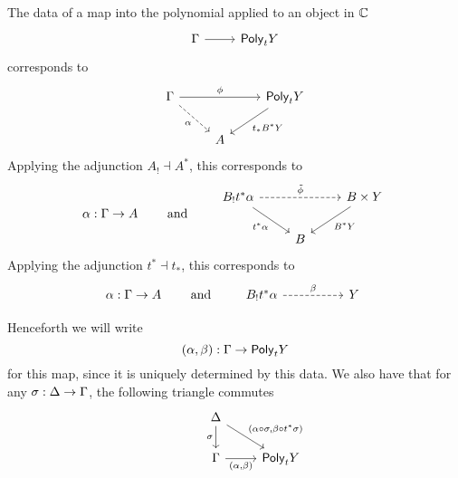 \begin{prop}
  \label{polynomial_endofunctor_property}
  The data of a map into the polynomial applied to an object in $\mathbb{C}$
\[\begin{tikzcd}
	\Ga & {\Poly{t} Y}
	\arrow[from=1-1, to=1-2]
\end{tikzcd}\]
  corresponds to
\[\begin{tikzcd}
	\Ga && {\Poly{t} Y} \\
	& A
	\arrow["\phi", from=1-1, to=1-3]
	\arrow["\al"', dashed, from=1-1, to=2-2]
	\arrow["{t_* B^* Y}", from=1-3, to=2-2]
\end{tikzcd}\]
  Applying the adjunction $A_{!} \dashv A^{*}$, this corresponds to
  \[
    \al : \Ga \to A
    \quad \quad \text{ and }
    \quad \quad
    \begin{tikzcd}
    {B_! t^*\al} && {B \times Y} \\
    & B
    \arrow["{\tilde{\phi}}", dashed, from=1-1, to=1-3]
    \arrow["{t^*\al}"', from=1-1, to=2-2]
    \arrow["{B^* Y}", from=1-3, to=2-2]
  \end{tikzcd}
\]
  Applying the adjunction $t^{*} \dashv t_{*}$,
  this corresponds to
  \[
    \al : \Ga \to A
    \quad \quad \text{ and }
    \quad \quad
    \begin{tikzcd}
    {B_! t^*\al} && Y
    \arrow["{\beta}", dashed, from=1-1, to=1-3]
  \end{tikzcd}\]

  Henceforth we will write
  \[ (\alpha, \beta) : \Gamma \to \mathsf{Poly}_{t} Y\]
  for this map,
  since it is uniquely determined by this data.
  We also have that for any $\sigma : \Delta \to \Gamma$,
  the following triangle commutes
\[\begin{tikzcd}
	& \De \\
	{} & \Ga & {\Poly{t} Y}
	\arrow["\si"', from=1-2, to=2-2]
	\arrow["{(\al \circ \si, \be \circ t^* \si)}", from=1-2, to=2-3]
	\arrow["{(\al, \be)}"', from=2-2, to=2-3]
\end{tikzcd}\]
\end{prop}

\medskip
